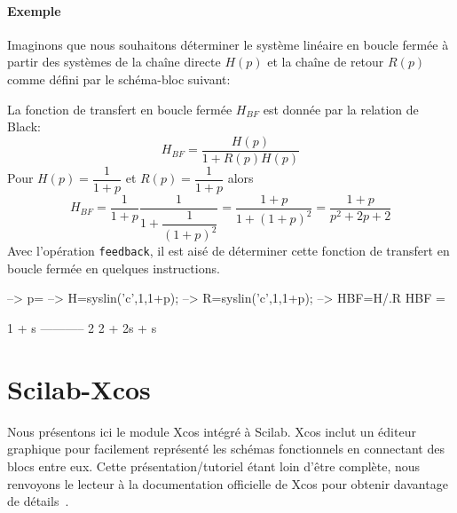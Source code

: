\paragraph{Exemple}
Imaginons que nous souhaitons déterminer
le système linéaire en boucle fermée à partir des systèmes de la chaîne 
directe $H(p)$ et la chaîne de retour $R(p)$ comme défini par le schéma-bloc 
suivant:
\begin{center}
    
\end{center}
La fonction de transfert en boucle fermée $H_{BF}$ est donnée par la relation 
de Black:
\[
H_{BF}=\dfrac{H(p)}{1+R(p)H(p)}
\]
Pour $H(p)=\dfrac{1}{1+p}$ et $R(p)=\dfrac{1}{1+p}$ alors 
\[
H_{BF}=\dfrac{1}{1+p}\dfrac{1}{1+\dfrac{1}{(1+p)^2}}
      =\dfrac{1+p}{1+(1+p)^2}=\dfrac{1+p}{p^2+2p+2}
\]
Avec l'opération \verb?feedback?, il est aisé de déterminer cette fonction 
de transfert en boucle fermée en quelques instructions.
\begin{Scilabcode}
--> p=%
--> H=syslin('c',1,1+p);
--> R=syslin('c',1,1+p);
--> HBF=H/.R
 HBF  = 
                 
       1 + s      
     -----------  
               2  
     2 + 2s + s 
\end{Scilabcode}
\section{Scilab-Xcos}
Nous présentons ici le module Xcos intégré à Scilab. Xcos inclut un 
éditeur graphique pour facilement représenté les schémas fonctionnels
en connectant des blocs entre eux. Cette présentation/tutoriel étant loin 
d'être complète, nous renvoyons le lecteur à la documentation officielle de 
Xcos pour obtenir davantage de détails~\cite{steer2014scilab,premier,xcos}. 
